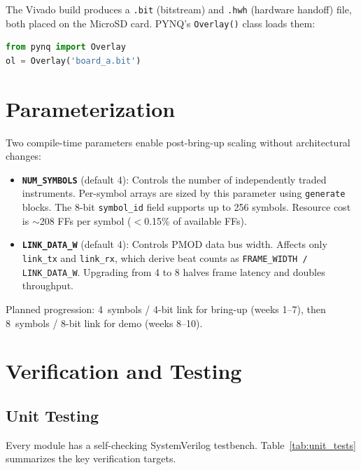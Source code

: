 \documentclass[conference]{IEEEtran}
\begin{document}
The Vivado build produces a \texttt{.bit} (bitstream) and \texttt{.hwh} (hardware handoff) file, both placed on the MicroSD card. PYNQ's \texttt{Overlay()} class loads them:

\begin{lstlisting}[language=Python]
from pynq import Overlay
ol = Overlay('board_a.bit')
\end{lstlisting}

\section{Parameterization}

Two compile-time parameters enable post-bring-up scaling without architectural changes:

\begin{itemize}[noitemsep]
  \item \textbf{\texttt{NUM\_SYMBOLS}} (default 4): Controls the number of independently traded instruments. Per-symbol arrays are sized by this parameter using \texttt{generate} blocks. The 8-bit \texttt{symbol\_id} field supports up to 256 symbols. Resource cost is $\sim$208 FFs per symbol ($<$0.15\% of available FFs).
  \item \textbf{\texttt{LINK\_DATA\_W}} (default 4): Controls PMOD data bus width. Affects only \texttt{link\_tx} and \texttt{link\_rx}, which derive beat counts as \texttt{FRAME\_WIDTH / LINK\_DATA\_W}. Upgrading from 4 to 8 halves frame latency and doubles throughput.
\end{itemize}

Planned progression: 4~symbols / 4-bit link for bring-up (weeks 1--7), then 8~symbols / 8-bit link for demo (weeks 8--10).

\section{Verification and Testing}

\subsection{Unit Testing}

Every module has a self-checking SystemVerilog testbench. Table~\ref{tab:unit_tests} summarizes the key verification targets.
\end{document}
